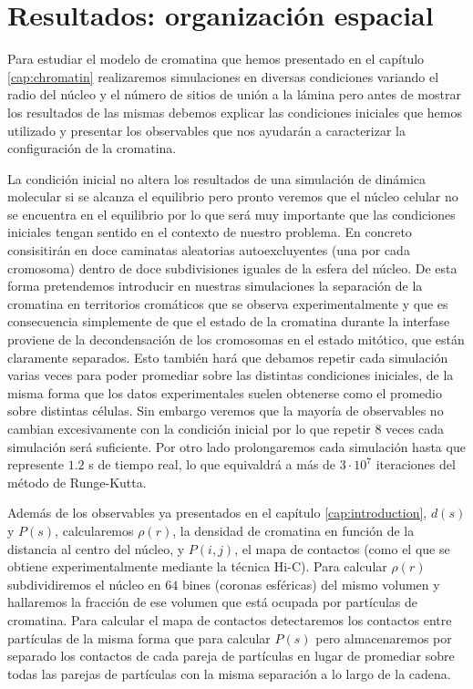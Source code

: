 \chapter{Resultados: organización espacial}
\label{cap:results}

Para estudiar el modelo de cromatina que hemos presentado en el capítulo \ref{cap:chromatin} realizaremos simulaciones en diversas condiciones variando el radio del núcleo y el número de sitios de unión a la lámina pero antes de mostrar los resultados de las mismas debemos explicar las condiciones iniciales que hemos utilizado y presentar los observables que nos ayudarán a caracterizar la configuración de la cromatina.

La condición inicial no altera los resultados de una simulación de dinámica molecular si se alcanza el equilibrio pero pronto veremos que el núcleo celular no se encuentra en el equilibrio por lo que será muy importante que las condiciones iniciales tengan sentido en el contexto de nuestro problema. En concreto consisitirán en doce caminatas aleatorias autoexcluyentes (una por cada cromosoma) dentro de doce subdivisiones iguales de la esfera del núcleo. De esta forma pretendemos introducir en nuestras simulaciones la separación de la cromatina en territorios cromáticos que se observa experimentalmente y que es consecuencia simplemente de que el estado de la cromatina durante la interfase proviene de la decondensación de los cromosomas en el estado mitótico, que están claramente separados. Esto también hará que debamos repetir cada simulación varias veces para poder promediar sobre las distintas condiciones iniciales, de la misma forma que los datos experimentales suelen obtenerse como el promedio sobre distintas células. Sin embargo veremos que la mayoría de observables no cambian excesivamente con la condición inicial por lo que repetir $8$ veces cada simulación será suficiente. Por otro lado prolongaremos cada simulación hasta que represente $1.2$ s de tiempo real, lo que equivaldrá a más de $3\cdot10^7$ iteraciones del método de Runge-Kutta.

Además de los observables ya presentados en el capítulo \ref{cap:introduction}, $d(s)$ y $P(s)$, calcularemos $\rho(r)$, la densidad de cromatina en función de la distancia al centro del núcleo, y $P(i,j)$, el mapa de contactos (como el que se obtiene experimentalmente mediante la técnica Hi-C). Para calcular $\rho(r)$ subdividiremos el núcleo en $64$ bines (coronas esféricas) del mismo volumen y hallaremos la fracción de ese volumen que está ocupada por partículas de cromatina. Para calcular el mapa de contactos detectaremos los contactos entre partículas de la misma forma que para calcular $P(s)$ pero almacenaremos por separado los contactos de cada pareja de partículas en lugar de promediar sobre todas las parejas de partículas con la misma separación a lo largo de la cadena.

